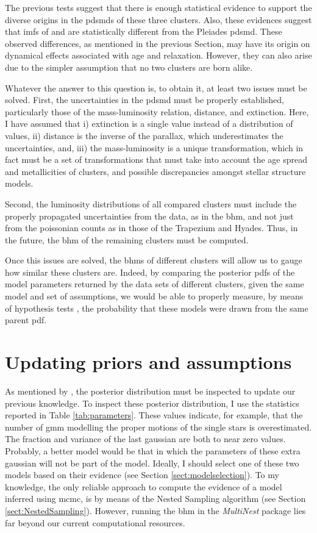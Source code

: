 The previous tests suggest that there is enough statistical evidence  to support the diverse origins in the \glspl{pdsmd} of these three clusters. Also, these evidences suggest that \glspl{imf} of \citet{Chabrier2005} and \citet{Thies2007} are statistically different from the  Pleiades \gls{pdsmd}.  These observed differences, as mentioned in the previous Section, may have its origin on dynamical effects associated with age and relaxation. However, they can also arise due to the simpler assumption that no two clusters are born alike.

Whatever the answer to this question is, to obtain it, at least two issues must be solved. 
First, the uncertainties in the \gls{pdsmd} must be properly established, particularly those of the mass-luminosity relation, distance, and extinction. Here, I have assumed that i) extinction is a single value instead of a distribution of values, ii) distance is the inverse of the parallax, which underestimates the uncertainties, and, iii) the mass-luminosity is a unique transformation, which in fact must be a set of transformations that must take into account the age spread and metallicities of clusters, and possible discrepancies amongst stellar structure models.

Second, the luminosity distributions of all compared clusters must include the properly propagated uncertainties from the data, as in the \gls{bhm}, and not just from the poissonian counts as in those of the Trapezium and Hyades. Thus, in the future, the \gls{bhm} of the remaining clusters must be computed. 

Once this issues are solved, the \glspl{bhm} of different clusters will allow us to gauge how similar these clusters are. Indeed, by comparing the posterior \glspl{pdf} of the model parameters returned by the data sets of different clusters, given the same model and set of assumptions, we would be able to properly measure, by means of hypothesis tests \cite[see for example][]{Rueda1992}, the probability that these models were drawn from the same parent \gls{pdf}. 

\section{Updating priors and assumptions}
\label{sect:updating_priors}
As mentioned by \citet{Gelman2006}, the posterior distribution must be inspected to update our previous knowledge. To inspect these posterior distribution, I use the statistics reported in Table \ref{tab:parameters}. These values indicate, for example, that the number of  \gls{gmm} modelling the proper motions of the single stars is overestimated. The fraction and variance of the last gaussian are both to near zero values. Probably, a better model would be that in which the parameters of these extra gaussian will not be part of the model. Ideally, I should select one of these two models based on their evidence (see Section \ref{sect:modelselection}). To my knowledge, the only reliable approach to compute the evidence of a model inferred using \gls{mcmc}, is by means of the Nested Sampling algorithm (see Section \ref{sect:NestedSampling}). However, running the \gls{bhm} in the \emph{MultiNest} package lies far beyond our current computational resources.

